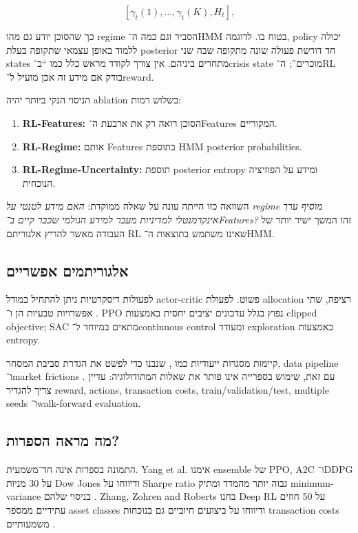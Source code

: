 \begin{equation}
\left[\gamma_t(1),\ldots,\gamma_t(K),H_t\right],
\end{equation}

כך שהסוכן יודע גם מהו regime הסביר וגם כמה ה־HMM בטוח בו. לדוגמה, policy יכולה ללמוד באופן עצמאי שתקופה בעלת posterior חד דורשת פעולה שונה מתקופה שבה שני states מתחרים ביניהם. אין צורך לקודד מראש כלל כמו ``ב־crisis state מוכרים''; ה־RL בודק אם מידע זה אכן מועיל ל־reward.

הניסוי הנקי ביותר יהיה ablation בשלוש רמות:

\begin{enumerate}
    \item \textbf{RL-Features:} הסוכן רואה רק את ארבעת ה־Features המקוריים.
    \item \textbf{RL-Regime:} אותם Features בתוספת HMM posterior probabilities.
    \item \textbf{RL-Regime-Uncertainty:} תוספת posterior entropy ומידע על הפוזיציה הנוכחית.
\end{enumerate}

השוואה כזו הייתה עונה על שאלה ממוקדת: \textit{האם מידע לטנטי על regime מוסיף ערך אינקרמנטלי למדיניות מעבר למידע הגולמי שכבר קיים ב־Features?} זהו המשך ישיר יותר של העבודה מאשר להריץ אלגוריתם RL שאינו משתמש בתוצאות ה־HMM.

\subsection{אלגוריתמים אפשריים}

לפעולות דיסקרטיות ניתן להתחיל במודל actor-critic פשוט. לפעולת allocation רציפה, שתי אפשרויות טבעיות הן  \cite{schulman2017ppo} ו־ \cite{haarnoja2018sac}. PPO נפוץ בגלל עדכונים יציבים יחסית באמצעות clipped objective; SAC מתאים במיוחד ל־continuous control ומעודד exploration באמצעות entropy.

קיימות מסגרות ייעודיות כמו , שנבנו כדי לפשט את הגדרת סביבת המסחר, data pipeline ו־market frictions \cite{liu2021finrl}. עם זאת, שימוש בספרייה אינו פותר את שאלות המתודולוגיה: עדיין צריך להגדיר reward, actions, transaction costs, train/validation/test, multiple seeds ו־walk-forward evaluation.

\subsection{מה מראה הספרות?}

התמונה בספרות אינה חד־משמעית. Yang et al. אימנו ensemble של PPO, A2C ו־DDPG על 30 מניות Dow Jones ודיווחו על Sharpe ratio גבוה יותר מהמדד ומתיק minimum-variance בניסוי שלהם \cite{yang2020ensemble}. Zhang, Zohren and Roberts בחנו Deep RL על 50 חוזים עתידיים ממספר asset classes ודיווחו על ביצועים חיוביים גם בנוכחות transaction costs משמעותיים \cite{zhang2019drltrading}.

